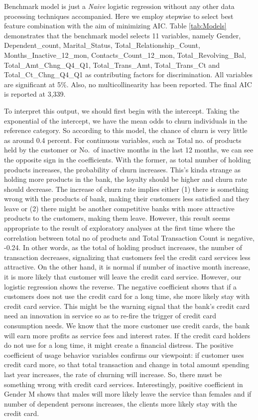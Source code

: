 Benchmark model is just a \emph{Naive} logistic regression without any
other data processing techniques accompanied. Here we employ stepwise to
select best feature combination with the aim of minimizing AIC. Table
\ref{tab:Models} demonstrates that the benchmark model selects 11
variables, namely Gender, Dependent\_count, Marital\_Status,
Total\_Relationship\_Count, Months\_Inactive\_12\_mon,
Contacts\_Count\_12\_mon, Total\_Revolving\_Bal,
Total\_Amt\_Chng\_Q4\_Q1, Total\_Trans\_Amt, Total\_Trans\_Ct and
Total\_Ct\_Chng\_Q4\_Q1 as contributing factors for discrimination. All
variables are significant at 5\%. Also, no multicollinearity has been
reported. The final AIC is reported at 3,339.

To interpret this output, we should first begin with the intercept.
Taking the exponential of the intercept, we have the mean odds to churn
individuals in the reference category. So according to this model, the
chance of churn is very little as around 0.4 percent. For continuous
variables, such as Total no. of products held by the customer or No.~of
inactive months in the last 12 months, we can see the opposite sign in
the coefficients. With the former, as total number of holding products
increases, the probability of churn increases. This's kinda strange as
holding more products in the bank, the loyalty should be higher and
churn rate should decrease. The increase of churn rate implies either
(1) there is something wrong with the products of bank, making their
customers less satisfied and they leave or (2) there might be another
competitive banks with more attractive products to the customers, making
them leave. However, this result seems appropriate to the result of
exploratory analyses at the first time where the correlation between
total no of products and Total Transaction Count is negative, -0.24. In
other words, as the total of holding product increases, the number of
transaction decreases, signalizing that customers feel the credit card
services less attractive. On the other hand, it is normal if number of
inactive month increase, it is more likely that customer will leave the
credit card service. However, our logistic regression shows the reverse.
The negative coefficient shows that if a customers does not use the
credit card for a long time, she more likely stay with credit card
service. This might be the warning signal that the bank's credit card
need an innovation in service so as to re-fire the trigger of credit
card consumption needs. We know that the more customer use credit cards,
the bank will earn more profits as service fees and interest rates. If
the credit card holders do not use for a long time, it might create a
financial distress. The positive coefficient of usage behavior variables
confirms our viewpoint: if customer uses credit card more, so that total
transaction and change in total amount spending last year increases, the
rate of churning will increase. So, there must be something wrong with
credit card services. Interestingly, positive coefficient in Gender M
shows that males will more likely leave the service than females and if
number of dependent persons increases, the clients more likely stay with
the credit card.

